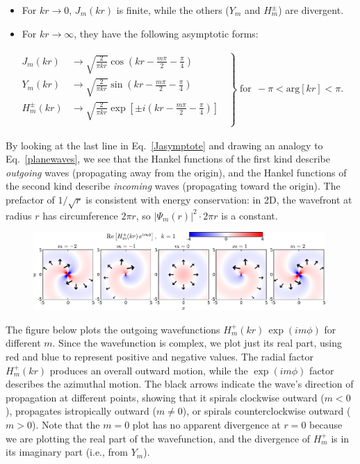 \documentclass[pra,12pt]{revtex4}
\begin{document}
\begin{itemize}
\item For $kr \rightarrow 0$, $J_m(kr)$ is finite, while the others ($Y_m$ and
$H_m^\pm$) are divergent.

\item For $kr \rightarrow \infty$, they have the following asymptotic forms:
\end{itemize}
\vskip -0.26in
\begin{align}
  \left.
  \begin{aligned}
    J_m(kr) &\rightarrow
    \sqrt{\frac{2}{\pi kr}} \cos\!\left(kr - \frac{m\pi}{2} - \frac{\pi}{4}\right) \\
    Y_m(kr) &\rightarrow
    \sqrt{\frac{2}{\pi kr}} \sin\!\left(kr - \frac{m\pi}{2} - \frac{\pi}{4}\right) \\
    H_m^\pm(kr) &\rightarrow
    \sqrt{\frac{2}{\pi kr}}
    \exp\left[\pm i\left(kr - \frac{m\pi}{2} - \frac{\pi}{4}\right)\right] \\
  \end{aligned}\;\;
  \right\}
  \; \text{for}\;\, -\pi < \mathrm{arg}[kr] < \pi.
  \label{Jasymptote}
\end{align}

By looking at the last line in Eq.~\eqref{Jasymptote} and drawing an
analogy to Eq.~\eqref{planewaves}, we see that the Hankel functions of
the first kind describe \textit{outgoing} waves (propagating away from
the origin), and the Hankel functions of the second kind describe
\textit{incoming} waves (propagating toward the origin).  The
prefactor of $1/\sqrt{r}$ is consistent with energy conservation: in
2D, the wavefront at radius $r$ has circumference $2\pi r$, so
$|\Psi_m(r)|^2 \cdot 2\pi r$ is a constant.

\begin{figure}[b]
  \centering\includegraphics[width=0.99\textwidth]{bessels}
\end{figure}

The figure below plots the outgoing wavefunctions $H_m^+(kr) \,
\exp(im\phi)$ for different $m$.  Since the wavefunction is complex,
we plot just its real part, using red and blue to represent positive
and negative values.  The radial factor $H_m^+(kr)$ produces an
overall outward motion, while the $\exp(im\phi)$ factor describes the
azimuthal motion.  The black arrows indicate the wave's direction of
propagation at different points, showing that it spirals clockwise
outward ($m < 0$), propagates istropically outward ($m \ne 0$), or
spirals counterclockwise outward ($m > 0$).  Note that the $m = 0$
plot has no apparent divergence at $r = 0$ because we are plotting the
real part of the wavefunction, and the divergence of $H_m^+$ is in its
imaginary part (i.e., from $Y_m$).
\end{document}
